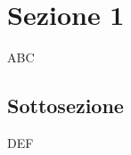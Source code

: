 \newcommand{\documento}{\SdF}
\newcommand{\nomedocumentofisico}{StudioDiFattibilit\`a\_v1\_0\_0.pdf}
\newcommand{\redazione}{\LC\\ & \TG\\ & \CV\\ & \SG\\ & \NC\\ & \MM}
\newcommand{\verifica}{\LC\\ & \TG}
\newcommand{\approvazione}{\CV}
\newcommand{\uso}{Interno}
\newcommand{\destinateTo}{\TV, \\ & \RC, \\ & \II}

\newcommand{\datacreazione}{22 novembre 2018}
\newcommand{\datamodifica}{07 Gennaio 2016}
\newcommand{\stato}{Approvato}

\def\TABELLE{false}	%
\def\FIGURE{false} 	%


%


\setcounter{secnumdepth}{4}
\setcounter{tocdepth}{4}


	
	
	
	\section{Sezione 1}
	ABC
	\subsection{Sottosezione}
	DEF
	
